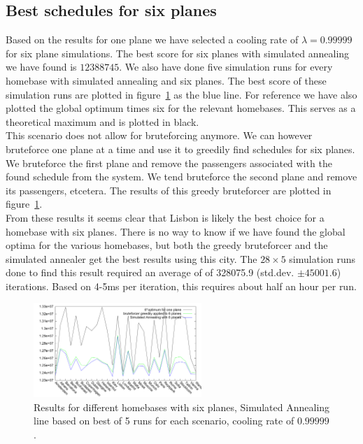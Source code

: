 \documentclass[journal]{IEEEtran}
\begin{document}
\subsection{Best schedules for six planes}
Based on the results for one plane we have selected a cooling rate of $\lambda=0.99999$ for six plane simulations. The best score for six planes with simulated annealing we have found is $\num{12388745}$.  We also have done five simulation runs for every homebase with simulated annealing and six planes. The best score of these simulation runs are plotted in figure~\ref{fig:different_homebase_six_planes} as the blue line. For reference we have also plotted the global optimum times six for the relevant homebases. This serves as a theoretical maximum and is plotted in black.\\
This scenario does not allow for bruteforcing anymore. We can however bruteforce one plane at a time and use it to greedily find schedules for six planes. We bruteforce the first plane and remove the passengers associated with the found schedule from the system. We tend bruteforce the second plane and remove its passengers, etcetera. The results of this greedy bruteforcer are plotted in figure~\ref{fig:different_homebase_six_planes}.  
\\
From these results it seems clear that Lisbon is likely the best choice for a homebase with six planes. There is no way to know if we have found the global optima for the various homebases, but both the greedy bruteforcer and the simulated annealer get the best results using this city. The $28\times5$ simulation runs done to find this result required an average of of 328075.9 (std.dev. $\pm 45001.6$) iterations. Based on 4-5ms per iteration, this requires about half an hour per run.\\
\begin{figure}[!h]
\centering
\includegraphics[width=2.5in]{different_homebases}
\caption{Results for different homebases with six planes, Simulated Annealing line based on best of 5 runs for each scenario, cooling rate of $0.99999$.}
\label{fig:different_homebase_six_planes}
\end{figure}
\\
\end{document}

